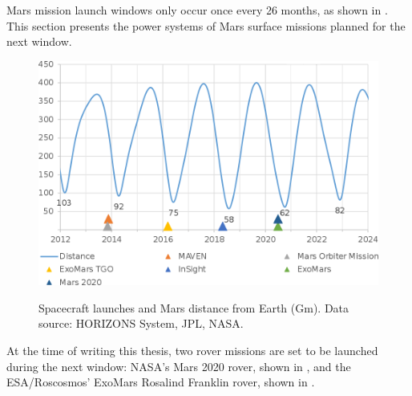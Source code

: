 Mars mission launch windows only occur once every 26 months, as shown in . This section presents the power systems of Mars surface missions planned for the next window.

\begin{figure}[h]
  \captionsetup[subfigure]{justification=centering}
  \centering
  \hypersetup{linkcolor=captionTextColor}
  \includegraphics[width=0.5\linewidth]{sections/state-of-the-art/planned-missions/plots/mars-distance-from-earth.png}\\
  \caption[Spacecraft launches and Mars distance from Earth]
          {Spacecraft launches and Mars distance from Earth (Gm). Data source: HORIZONS System, JPL, NASA.}
  \label{fig:mars-distance-from-earth}
\end{figure}

At the time of writing this thesis, two rover missions are set to be launched during the next window: \ac{NASA}'s Mars 2020 rover, shown in , and the \ac{ESA}/Roscosmos' ExoMars Rosalind Franklin rover, shown in .

\vspace{0.5cm}

